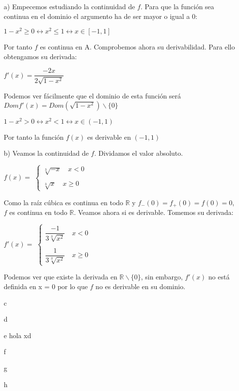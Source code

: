 \documentclass[12pt,a4paper]{article}
\begin{document}
\begin{enumerate}
	\item[a)] Empecemos estudiando la continuidad de $f$. Para que la función sea continua en el dominio el argumento ha de ser mayor o igual a 0: \\
	\begin{center}
		$1-x^{2} \geq 0 \leftrightarrow x^{2} \leq 1 \leftrightarrow x \in [-1,1]$
	\end{center}
	Por tanto $f$ es continua en A. Comprobemos ahora su derivabilidad. Para ello obtengamos su derivada:
	\begin{center}
		$f'(x)=\dfrac{-2x}{2\sqrt{1-x^{2}}}$
	\end{center}
	Podemos ver fácilmente que el dominio de esta función será
	$Domf'(x) = Dom(\sqrt{1-x^{2}}) \backslash \{0\}$
	\begin{center}
		$1-x^{2} > 0 \leftrightarrow x^{2} < 1 \leftrightarrow x \in (-1,1)$
	\end{center}
	Por tanto la función $f(x)$ es derivable en $(-1, 1)$
	
	\item[b)] Veamos la continuidad de $f$. Dividamos el valor absoluto.
	
	\begin{center}
		$f(x) = $ 
		$\left\lbrace
		\begin{array}{rcl}
			\sqrt[3]{-x} \quad  x < 0
		\\
		\\  \sqrt[3]{x} \quad x \geq 0
		\end{array}
		\right.$ \\ 
	\end{center}
	Como la raíz cúbica es continua en todo $\mathbb{R}$ y $f_-(0) = f_+(0) = f(0) = 0$, $f$ es continua en todo $\mathbb{R}$. Veamos ahora si es derivable. Tomemos su derivada:
	
	\begin{center}
		$f'(x) = $ 
		$\left\lbrace
		\begin{array}{rcl}
		   \dfrac{-1}{3\sqrt[3]{x^{2}}} \quad  x < 0
		\\
		\\ \dfrac{1}{3\sqrt[3]{x^{2}}} \quad x \geq 0
		\end{array}
		\right.$
	\end{center}
	Podemos ver que existe la derivada en $\mathbb{R} \backslash \{0\}$, sin embargo, $f'(x)$ no está definida en x = 0 por lo que $f$ no es derivable en su dominio.
	\item[c]
 	\item[d]
 	\item[e] hola xd
 	\item[f]
 	\item[g]
 	\item[h]
\end{enumerate}
	
\end{document}
